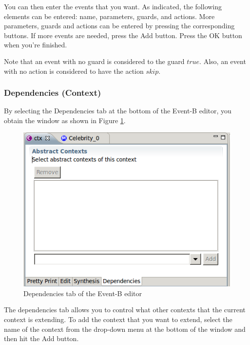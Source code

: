 You can then enter the events that you want. As indicated, the following elements can be entered: name, parameters, guards, and actions. More parameters, guards and actions can be entered by pressing the corresponding buttons. If more events are needed, press the \textsf{Add} button. Press the \textsf{OK} button when you're finished.

Note that an event with no guard is considered to the guard $true$. Also, an event with no action is considered to have the action $skip$. 

\subsubsection{Dependencies (Context)}

By selecting the \textsf{Dependencies} tab at the bottom of the Event-B editor, you obtain the window as shown in Figure \ref{fig_ref_01_eventb_editor8}.

\begin{figure}[!ht]
\begin{center}
	\includegraphics{img/reference/ref_01_eventb_editor8.png}
	\caption{Dependencies tab of the Event-B editor}
	\label{fig_ref_01_eventb_editor8}
\end{center}
\end{figure}

The dependencies tab allows you to control what other contexts that the current context is extending. To add the context that you want to extend, select the name of the context from the drop-down menu at the bottom of the window and then hit the \textsf{Add} button.

